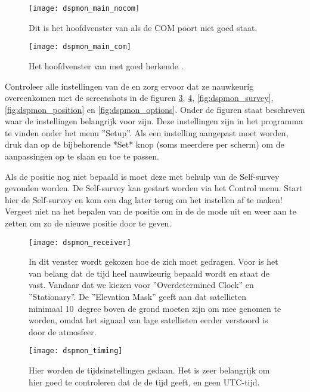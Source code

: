 \begin{figure}
    \centering
    \texttt{[image: dspmon\_main\_nocom]}
    \caption{Dit is het hoofdvenster van \dspmon als de COM poort niet
    goed staat.}
    \label{fig:dspmon_main_nocom}
\end{figure}

\begin{figure}
    \centering
    \texttt{[image: dspmon\_main\_com]}
    \caption{Het hoofdvenster van \dspmon met goed herkende \gps.}
    \label{fig:dspmon_main_com}
\end{figure}

Controleer alle instellingen van de \gps en zorg ervoor dat ze
nauwkeurig overeenkomen met de screenshots in de figuren
\ref{fig:dspmon_receiver}, \ref{fig:dspmon_timing},
\ref{fig:dspmon_survey}, \ref{fig:dspmon_position} en
\ref{fig:dspmon_options}. Onder de figuren staat beschreven waar de
instellingen belangrijk voor zijn. Deze instellingen zijn in het
programma te vinden onder het menu ''Setup''. Als een instelling
aangepast moet worden, druk dan op de bijbehorende *Set* knop (soms
meerdere per scherm) om de aanpassingen op te slaan en toe te passen.

Als de \gps positie nog niet bepaald is moet deze met behulp van de
Self-survey gevonden worden. De Self-survey kan gestart worden via het
Control menu. Start hier de Self-survey en kom een dag later terug om
het instellen af te maken! Vergeet niet na het bepalen van de positie om
in de \hisparc \daq de \daq mode uit en weer aan te zetten om zo de
nieuwe positie door te geven.

\begin{figure}
    \centering
    \texttt{[image: dspmon\_receiver]}
    \caption{In dit venster wordt gekozen hoe de \gps zich moet gedragen.
    Voor \hisparc is het van belang dat de tijd heel nauwkeurig bepaald
    wordt en staat de \gps vast. Vandaar dat we kiezen voor
    ''Overdetermined Clock'' en ''Stationary''. De ''Elevation Mask''
    geeft aan dat satellieten minimaal \SI{10}{degree} boven de grond
    moeten zijn om mee genomen te worden, omdat het signaal van
    lage satellieten eerder verstoord is door de atmosfeer.}
    \label{fig:dspmon_receiver}
\end{figure}

\begin{figure}
    \centering
    \texttt{[image: dspmon\_timing]}
    \caption{Hier worden de tijdsinstellingen gedaan. Het is zeer
    belangrijk om hier goed te controleren dat de \gps de \gps tijd
    geeft, en geen UTC-tijd.}
    \label{fig:dspmon_timing}
\end{figure}

